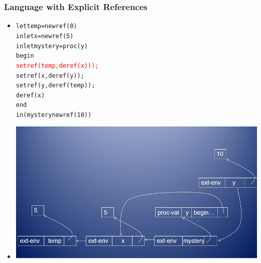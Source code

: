 \documentclass{beamer}
\begin{document}
\begin{frame}[fragile]
\frametitle{Language with Explicit References}
\begin{scriptsize}
\begin{itemize}
\item<1->
\begin{alltt}
let temp = newref(0)
in  let x = newref(5)
    in  let mystery = proc (y)
                        begin
                          \textcolor{red}{setref(temp, deref(x)));}
                          setref(x, deref(y));
                          setref(y, deref(temp));
                          deref(x)
				        end
	    in (mystery newref(10))
\end{alltt}

\item<1->
\begin{center}
\includegraphics[scale=0.5]{mystery2.jpg}
\end{center}

\end{itemize}
\end{scriptsize}
\end{frame}
\end{document}
